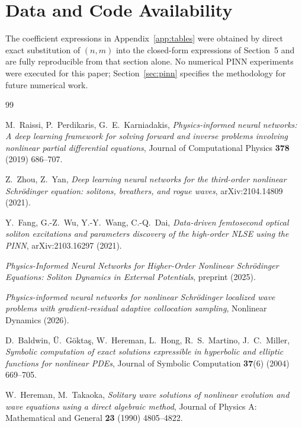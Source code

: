 \documentclass[11pt]{article}
\begin{document}
\section*{Data and Code Availability}
The coefficient expressions in Appendix~\ref{app:tables} were obtained by direct exact
substitution of $(n,m)$ into the closed-form expressions of Section~5 and are fully
reproducible from that section alone. No numerical PINN experiments were executed for
this paper; Section~\ref{sec:pinn} specifies the methodology for future numerical work.


\begin{thebibliography}{99}

M.~Raissi, P.~Perdikaris, G.~E.~Karniadakis,
\emph{Physics-informed neural networks: A deep learning framework for solving forward and
inverse problems involving nonlinear partial differential equations},
Journal of Computational Physics \textbf{378} (2019) 686--707.

Z.~Zhou, Z.~Yan,
\emph{Deep learning neural networks for the third-order nonlinear Schr\"odinger equation:
solitons, breathers, and rogue waves},
arXiv:2104.14809 (2021).

Y.~Fang, G.-Z.~Wu, Y.-Y.~Wang, C.-Q.~Dai,
\emph{Data-driven femtosecond optical soliton excitations and parameters discovery of the
high-order NLSE using the PINN},
arXiv:2103.16297 (2021).

\emph{Physics-Informed Neural Networks for Higher-Order Nonlinear Schr\"odinger Equations:
Soliton Dynamics in External Potentials}, preprint (2025).

\emph{Physics-informed neural networks for nonlinear Schr\"odinger localized wave problems
with gradient-residual adaptive collocation sampling},
Nonlinear Dynamics (2026).

D.~Baldwin, \"U.~G\"okta\c{s}, W.~Hereman, L.~Hong, R.~S.~Martino, J.~C.~Miller,
\emph{Symbolic computation of exact solutions expressible in hyperbolic and elliptic
functions for nonlinear PDEs},
Journal of Symbolic Computation \textbf{37}(6) (2004) 669--705.

W.~Hereman, M.~Takaoka,
\emph{Solitary wave solutions of nonlinear evolution and wave equations using a direct
algebraic method},
Journal of Physics A: Mathematical and General \textbf{23} (1990) 4805--4822.

\end{thebibliography}
\end{document}

